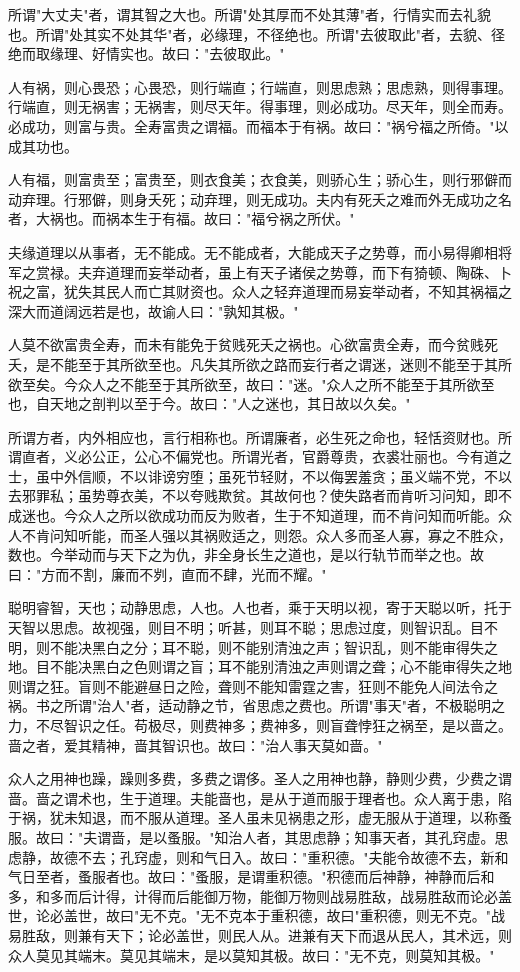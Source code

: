 \documentclass[]{article}
\begin{document}
所谓"大丈夫"者，谓其智之大也。所谓"处其厚而不处其薄"者，行情实而去礼貌也。所谓"处其实不处其华"者，必缘理，不径绝也。所谓"去彼取此"者，去貌、径绝而取缘理、好情实也。故曰："去彼取此。"

人有祸，则心畏恐；心畏恐，则行端直；行端直，则思虑熟；思虑熟，则得事理。行端直，则无祸害；无祸害，则尽天年。得事理，则必成功。尽天年，则全而寿。必成功，则富与贵。全寿富贵之谓福。而福本于有祸。故曰："祸兮福之所倚。"以成其功也。

人有福，则富贵至；富贵至，则衣食美；衣食美，则骄心生；骄心生，则行邪僻而动弃理。行邪僻，则身夭死；动弃理，则无成功。夫内有死夭之难而外无成功之名者，大祸也。而祸本生于有福。故曰："福兮祸之所伏。"

夫缘道理以从事者，无不能成。无不能成者，大能成天子之势尊，而小易得卿相将军之赏禄。夫弃道理而妄举动者，虽上有天子诸侯之势尊，而下有猗顿、陶硃、卜祝之富，犹失其民人而亡其财资也。众人之轻弃道理而易妄举动者，不知其祸福之深大而道阔远若是也，故谕人曰："孰知其极。"

人莫不欲富贵全寿，而未有能免于贫贱死夭之祸也。心欲富贵全寿，而今贫贱死夭，是不能至于其所欲至也。凡失其所欲之路而妄行者之谓迷，迷则不能至于其所欲至矣。今众人之不能至于其所欲至，故曰："迷。"众人之所不能至于其所欲至也，自天地之剖判以至于今。故曰："人之迷也，其日故以久矣。"

所谓方者，内外相应也，言行相称也。所谓廉者，必生死之命也，轻恬资财也。所谓直者，义必公正，公心不偏党也。所谓光者，官爵尊贵，衣裘壮丽也。今有道之士，虽中外信顺，不以诽谤穷堕；虽死节轻财，不以侮罢羞贪；虽义端不党，不以去邪罪私；虽势尊衣美，不以夸贱欺贫。其故何也？使失路者而肯听习问知，即不成迷也。今众人之所以欲成功而反为败者，生于不知道理，而不肯问知而听能。众人不肯问知听能，而圣人强以其祸败适之，则怨。众人多而圣人寡，寡之不胜众，数也。今举动而与天下之为仇，非全身长生之道也，是以行轨节而举之也。故曰："方而不割，廉而不刿，直而不肆，光而不耀。"

聪明睿智，天也；动静思虑，人也。人也者，乘于天明以视，寄于天聪以听，托于天智以思虑。故视强，则目不明；听甚，则耳不聪；思虑过度，则智识乱。目不明，则不能决黑白之分；耳不聪，则不能别清浊之声；智识乱，则不能审得失之地。目不能决黑白之色则谓之盲；耳不能别清浊之声则谓之聋；心不能审得失之地则谓之狂。盲则不能避昼日之险，聋则不能知雷霆之害，狂则不能免人间法令之祸。书之所谓"治人"者，适动静之节，省思虑之费也。所谓"事天"者，不极聪明之力，不尽智识之任。苟极尽，则费神多；费神多，则盲聋悖狂之祸至，是以啬之。啬之者，爱其精神，啬其智识也。故曰："治人事天莫如啬。"

众人之用神也躁，躁则多费，多费之谓侈。圣人之用神也静，静则少费，少费之谓啬。啬之谓术也，生于道理。夫能啬也，是从于道而服于理者也。众人离于患，陷于祸，犹未知退，而不服从道理。圣人虽未见祸患之形，虚无服从于道理，以称蚤服。故曰："夫谓啬，是以蚤服。"知治人者，其思虑静；知事天者，其孔窍虚。思虑静，故德不去；孔窍虚，则和气日入。故曰："重积德。"夫能令故德不去，新和气日至者，蚤服者也。故曰："蚤服，是谓重积德。"积德而后神静，神静而后和多，和多而后计得，计得而后能御万物，能御万物则战易胜敌，战易胜敌而论必盖世，论必盖世，故曰"无不克。"无不克本于重积德，故曰"重积德，则无不克。"战易胜敌，则兼有天下；论必盖世，则民人从。进兼有天下而退从民人，其术远，则众人莫见其端末。莫见其端末，是以莫知其极。故曰："无不克，则莫知其极。"
\end{document}

